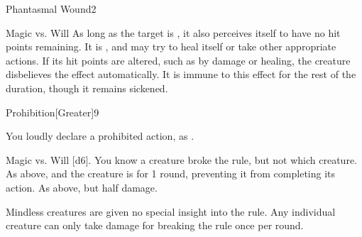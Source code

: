 \begin{spellfooter}
\begin{spellsection}{Phantasmal Wound}{2}
\begin{spellcontent}
\begin{spelleffects}
\begin{spellattack}{Magic vs. Will}
                As long as the target is \bloodied, it also perceives itself to have no hit points remaining. It is \staggered, and may try to heal itself or take other appropriate actions. If its hit points are altered, such as by damage or healing, the creature disbelieves the effect automatically. It is immune to this effect for the rest of the duration, though it remains sickened.
            \end{spellattack}
            \spelldur \durshort
        \end{spelleffects}
    \end{spellcontent}
    \begin{spellfooter}
    \end{spellfooter}
\end{spellsection}

\begin{spellsection}{Prohibition}[Greater]{9}
    \begin{spellheader}
    \end{spellheader}
    \begin{spellcontent}
        \spelleffect You loudly declare a prohibited action, as .
        \spelldur \durshort
    \end{spellcontent}
    \begin{spellsubcontent}
        \begin{spelltargetinginfo}
        \end{spelltargetinginfo}
        \begin{spelleffects}
            \begin{spellattack}{Magic vs. Will}
                \spellsuccess {}[d6]. You know a creature broke the rule, but not which creature.
                \spellcritical As above, and the creature is \stunned for 1 round, preventing it from completing its action.
                \spellfailure As above, but half damage.
            \end{spellattack}
        \end{spelleffects}
    \end{spellsubcontent}
    \begin{spellfooter}
        \spellnotes Mindless creatures are given no special insight into the rule. Any individual creature can only take damage for breaking the rule once per round.
    \end{spellfooter}
\end{spellsection}


\end{spellfooter}

